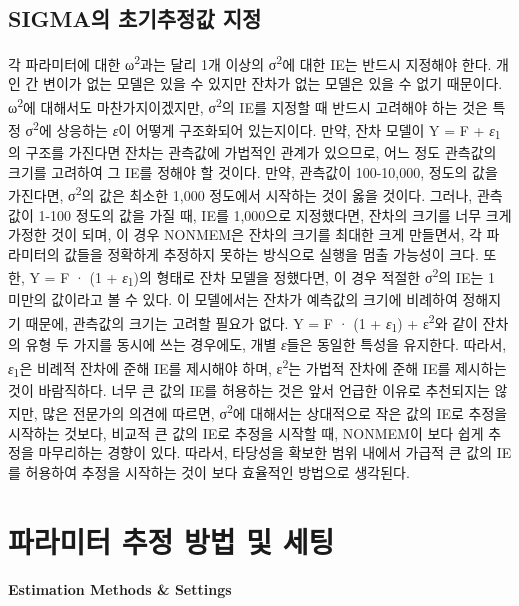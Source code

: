 \documentclass[
  10pt,
  krantz2,
  a4paper]{krantz}
\theoremstyle{definition}
\theoremstyle{definition}
\theoremstyle{definition}
\theoremstyle{remark}
\begin{document}
\hypertarget{sigmauxc758-uxcd08uxae30uxcd94uxc815uxac12-uxc9c0uxc815}{%
\section{SIGMA의 초기추정값 지정}\label{sigmauxc758-uxcd08uxae30uxcd94uxc815uxac12-uxc9c0uxc815}}

각 파라미터에 대한 ω\textsuperscript{2}과는 달리 1개 이상의 σ\textsuperscript{2}에 대한 IE는 반드시 지정해야 한다. 개인 간 변이가 없는 모델은 있을 수 있지만 잔차가 없는 모델은 있을 수 없기 때문이다. ω\textsuperscript{2}에 대해서도 마찬가지이겠지만, σ\textsuperscript{2}의 IE를 지정할 때 반드시 고려해야 하는 것은 특정 σ\textsuperscript{2}에 상응하는 \emph{ε}이 어떻게 구조화되어 있는지이다. 만약, 잔차 모델이 Y = F + \emph{ε}\textsubscript{1}의 구조를 가진다면 잔차는 관측값에 가법적인 관계가 있으므로, 어느 정도 관측값의 크기를 고려하여 그 IE를 정해야 할 것이다. 만약, 관측값이 100-10,000, 정도의 값을 가진다면, σ\textsuperscript{2}의 값은 최소한 1,000 정도에서 시작하는 것이 옳을 것이다. 그러나, 관측값이 1-100 정도의 값을 가질 때, IE를 1,000으로 지정했다면, 잔차의 크기를 너무 크게 가정한 것이 되며, 이 경우 NONMEM은 잔차의 크기를 최대한 크게 만들면서, 각 파라미터의 값들을 정확하게 추정하지 못하는 방식으로 실행을 멈출 가능성이 크다. 또한, Y = F · (1 + \emph{ε}\textsubscript{1})의 형태로 잔차 모델을 정했다면, 이 경우 적절한 σ\textsuperscript{2}의 IE는 1 미만의 값이라고 볼 수 있다. 이 모델에서는 잔차가 예측값의 크기에 비례하여 정해지기 때문에, 관측값의 크기는 고려할 필요가 없다. Y = F · (1 + \emph{ε}\textsubscript{1}) + ε\textsuperscript{2}와 같이 잔차의 유형 두 가지를 동시에 쓰는 경우에도, 개별 \emph{ε}들은 동일한 특성을 유지한다. 따라서, \emph{ε}\textsubscript{1}은 비례적 잔차에 준해 IE를 제시해야 하며, ε\textsuperscript{2}는 가법적 잔차에 준해 IE를 제시하는 것이 바람직하다. 너무 큰 값의 IE를 허용하는 것은 앞서 언급한 이유로 추천되지는 않지만, 많은 전문가의 의견에 따르면, σ\textsuperscript{2}에 대해서는 상대적으로 작은 값의 IE로 추정을 시작하는 것보다, 비교적 큰 값의 IE로 추정을 시작할 때, NONMEM이 보다 쉽게 추정을 마무리하는 경향이 있다. 따라서, 타당성을 확보한 범위 내에서 가급적 큰 값의 IE를 허용하여 추정을 시작하는 것이 보다 효율적인 방법으로 생각된다.

\hypertarget{estimation-methods}{%
\chapter{파라미터 추정 방법 및 세팅}\label{estimation-methods}}

\textbf{Estimation Methods \& Settings}
\end{document}
